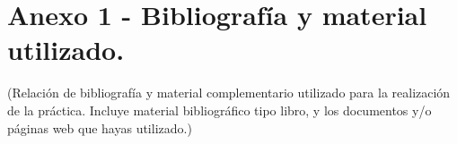\section{Anexo 1 - Bibliografía y material utilizado.}
(Relación de bibliografía y material complementario utilizado para la realización de la práctica. Incluye material bibliográfico tipo libro, y los documentos y/o páginas web que hayas utilizado.)